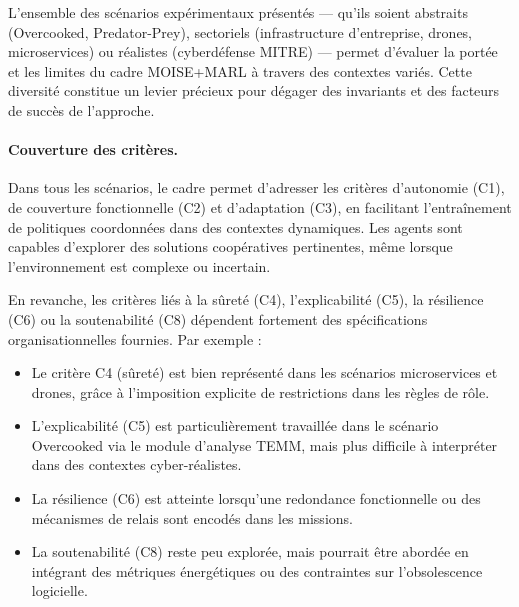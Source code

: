 L’ensemble des scénarios expérimentaux présentés — qu’ils soient abstraits (Overcooked, Predator-Prey), sectoriels (infrastructure d’entreprise, drones, microservices) ou réalistes (cyberdéfense MITRE) — permet d’évaluer la portée et les limites du cadre MOISE+MARL à travers des contextes variés. Cette diversité constitue un levier précieux pour dégager des invariants et des facteurs de succès de l’approche.

\paragraph{Couverture des critères.} Dans tous les scénarios, le cadre permet d’adresser les critères d’autonomie (C1), de couverture fonctionnelle (C2) et d’adaptation (C3), en facilitant l’entraînement de politiques coordonnées dans des contextes dynamiques. Les agents sont capables d’explorer des solutions coopératives pertinentes, même lorsque l’environnement est complexe ou incertain.

En revanche, les critères liés à la sûreté (C4), l’explicabilité (C5), la résilience (C6) ou la soutenabilité (C8) dépendent fortement des spécifications organisationnelles fournies. Par exemple :
\begin{itemize}
  \item Le critère C4 (sûreté) est bien représenté dans les scénarios microservices et drones, grâce à l’imposition explicite de restrictions dans les règles de rôle.
  \item L’explicabilité (C5) est particulièrement travaillée dans le scénario Overcooked via le module d’analyse TEMM, mais plus difficile à interpréter dans des contextes cyber-réalistes.
  \item La résilience (C6) est atteinte lorsqu’une redondance fonctionnelle ou des mécanismes de relais sont encodés dans les missions.
  \item La soutenabilité (C8) reste peu explorée, mais pourrait être abordée en intégrant des métriques énergétiques ou des contraintes sur l’obsolescence logicielle.
\end{itemize}

